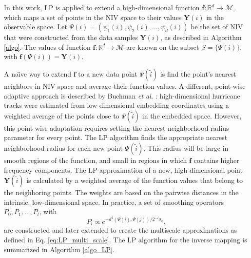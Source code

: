 \documentclass[aip,jcp,preprint]{revtex4-1}
\begin{document}
In this work, LP is applied to extend a high-dimensional function $\mathbf{f}:\mathbb{R}^d \rightarrow \mathcal{M}$, 
which maps a set of points in the NIV space to their values $\mathbf{Y}(i)$ in the observable space.
%
Let $\Psi(i) = \left(\psi_1(i),\psi_2(i),\ldots,\psi_d(i)\right)$ be the set of NIV that were constructed from the data samples $\mathbf{Y}(i)$, as described in Algorithm \ref{algo}.
%
The values of function $\mathbf{f}:\mathbb{R}^d \rightarrow \mathcal{M}$ are known on the subset $S = \{\Psi(i)\}$, with $\mathbf{f}(\Psi(i)) = \mathbf{Y}(i)$.

A na\"{\i}ve way to extend $\mathbf{f}$ to a new data point $\Psi(\tilde{i})$ is find the point's nearest neighbors in NIV space and average their function values.
%
A different, point-wise adaptive approach is described by Buchman {\em et al.} \cite{buchman2011high}:
high-dimensional hurricane tracks were estimated from low dimensional embedding coordinates using a weighted average of the points close to $\Psi(\tilde{i})$ in the embedded space.
%
However, this point-wise adaptation requires setting the nearest neighborhood radius parameter for every point.
%
The LP algorithm finds the appropriate nearest neighborhood radius for each new point $\Psi(\tilde{i})$.
%
This radius will be large in smooth regions of the function, and small in regions in which $\mathbf{f}$ contains higher frequency components.
%
The LP approximation of a new, high dimensional point $\mathbf{Y}(\tilde{i})$ is calculated by a weighted average of the function values that belong to the neighboring points.
%
The weights are based on the pairwise distances in the intrinsic, low-dimensional space.
%
In practice, a set of smoothing operators $P_0, P_1, \ldots, P_l$, with
\begin{equation} \label{eq:LP_multi_scale_app}
P_l \propto e^{-d^2(\Psi(i),\Psi(j)) / 2^{-l} \sigma_0},
\end{equation}
are constructed and later extended to create the multiscale approximations as defined in Eq. \ref{eq:LP_multi_scale}.
%
The LP algorithm for the inverse mapping is summarized in Algorithm \ref{algo_LP}.
\end{document}
